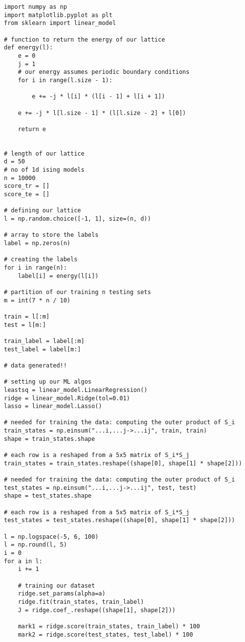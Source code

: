 \begin{verbatim}
import numpy as np
import matplotlib.pyplot as plt
from sklearn import linear_model

# function to return the energy of our lattice
def energy(l):
    e = 0
    j = 1
    # our energy assumes periodic boundary conditions
    for i in range(l.size - 1):

        e += -j * l[i] * (l[i - 1] + l[i + 1])

    e += -j * l[l.size - 1] * (l[l.size - 2] + l[0])

    return e


# length of our lattice
d = 50
# no of 1d ising models
n = 10000
score_tr = []
score_te = []

# defining our lattice
l = np.random.choice([-1, 1], size=(n, d))

# array to store the labels
label = np.zeros(n)

# creating the labels
for i in range(n):
    label[i] = energy(l[i])

# partition of our training n testing sets
m = int(7 * n / 10)

train = l[:m]
test = l[m:]

train_label = label[:m]
test_label = label[m:]

# data generated!!

# setting up our ML algos
leastsq = linear_model.LinearRegression()
ridge = linear_model.Ridge(tol=0.01)
lasso = linear_model.Lasso()

# needed for training the data: computing the outer product of S_i
train_states = np.einsum("...i,...j->...ij", train, train)
shape = train_states.shape

# each row is a reshaped from a 5x5 matrix of S_i*S_j
train_states = train_states.reshape((shape[0], shape[1] * shape[2]))

# needed for training the data: computing the outer product of S_i
test_states = np.einsum("...i,...j->...ij", test, test)
shape = test_states.shape

# each row is a reshaped from a 5x5 matrix of S_i*S_j
test_states = test_states.reshape((shape[0], shape[1] * shape[2]))

l = np.logspace(-5, 6, 100)
l = np.round(l, 5)
i = 0
for a in l:
    i += 1

    # training our dataset
    ridge.set_params(alpha=a)
    ridge.fit(train_states, train_label)
    J = ridge.coef_.reshape((shape[1], shape[2]))

    mark1 = ridge.score(train_states, train_label) * 100
    mark2 = ridge.score(test_states, test_label) * 100


\end{verbatim}
